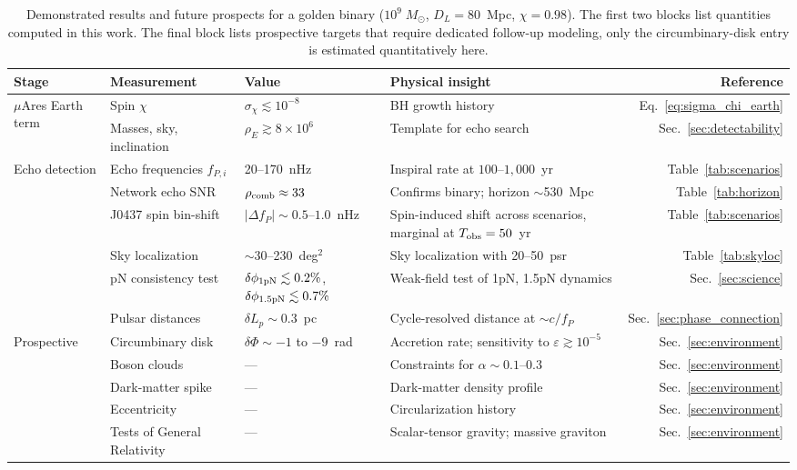 \documentclass[aps,prx,twocolumn,superscriptaddress,nofootinbib,longbibliography]{revtex4-2}
\newcommand{\Msun}{M_\odot}
\begin{document}
\begin{table}[t]
\caption{Demonstrated results and future prospects for a golden binary ($10^9\;\Msun$, $D_L=80$~Mpc, $\chi=0.98$). The first two blocks list quantities computed in this work. The final block lists prospective targets that require dedicated follow-up modeling, only the circumbinary-disk entry is estimated quantitatively here.}\label{tab:science_summary}
\centering
\small
\setlength{\tabcolsep}{3pt}
\begin{tabular}{l l l p{5.6cm} r}
\hline\hline
Stage & Measurement & Value & Physical insight & Reference \\
\hline
\multirow{2}{*}{$\mu$Ares Earth term}
& Spin $\chi$ & $\sigma_\chi \lesssim 10^{-8}$ & BH growth history & Eq.~\eqref{eq:sigma_chi_earth} \\
& Masses, sky, inclination & $\rho_E \gtrsim 8\!\times\!10^6$ & Template for echo search & Sec.~\ref{sec:detectability} \\[3pt]
\hline
\multirow{6}{*}{Echo detection}
& Echo frequencies $f_{P,i}$ & 20--170~nHz & Inspiral rate at $100$--$1,000$~yr & Table~\ref{tab:scenarios} \\
& Network echo SNR & $\rho_{\rm comb} \approx 33$ & Confirms binary; horizon $\sim$530~Mpc & Table~\ref{tab:horizon} \\
& J0437 spin bin-shift & $|\Delta f_P| \sim 0.5$--$1.0$~nHz & Spin-induced shift across scenarios, marginal at $T_{\rm obs}=50$~yr & Table~\ref{tab:scenarios} \\
& Sky localization & $\sim$30--230~deg$^2$ & Sky localization with 20--50~psr & Table~\ref{tab:skyloc} \\
& pN consistency test & $\delta\phi_{1\rm pN}\lesssim 0.2\%$, $\delta\phi_{1.5\rm pN}\lesssim 0.7\%$ & Weak-field test of 1pN, 1.5pN dynamics & Sec.~\ref{sec:science} \\
& Pulsar distances & $\delta L_p \sim 0.3$~pc & Cycle-resolved distance at $\sim c/f_P$ & Sec.~\ref{sec:phase_connection} \\[3pt]
\hline\hline
\multirow{5}{*}{Prospective}
& Circumbinary disk & $\delta\Phi \sim -1$ to $-9$~rad & Accretion rate; sensitivity to $\varepsilon \gtrsim 10^{-5}$ & Sec.~\ref{sec:environment} \\
& Boson clouds & --- & Constraints for $\alpha\sim0.1$--$0.3$ & Sec.~\ref{sec:environment} \\
& Dark-matter spike & --- & Dark-matter density profile & Sec.~\ref{sec:environment} \\
& Eccentricity & --- & Circularization history & Sec.~\ref{sec:environment} \\
& Tests of General Relativity & --- & Scalar-tensor gravity; massive graviton & Sec.~\ref{sec:environment} \\
\hline\hline
\end{tabular}
\end{table}
\end{document}
